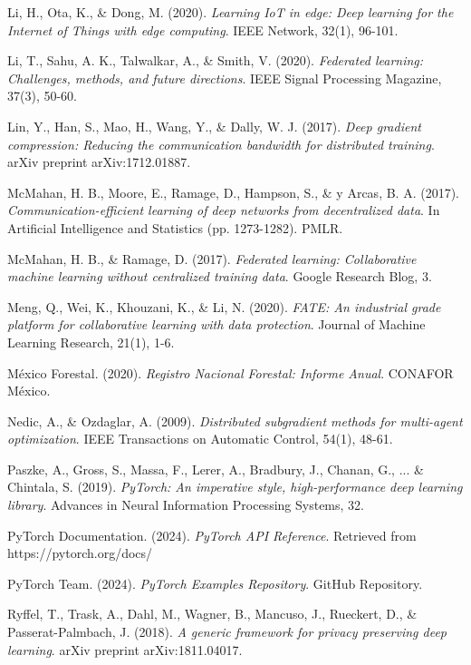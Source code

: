\begin{thebibliography}{99}
	Li, H., Ota, K., \& Dong, M. (2020).
	\textit{Learning IoT in edge: Deep learning for the Internet of Things with edge computing}.
	IEEE Network, 32(1), 96-101.
	
	Li, T., Sahu, A. K., Talwalkar, A., \& Smith, V. (2020).
	\textit{Federated learning: Challenges, methods, and future directions}.
	IEEE Signal Processing Magazine, 37(3), 50-60.
	
	Lin, Y., Han, S., Mao, H., Wang, Y., \& Dally, W. J. (2017).
	\textit{Deep gradient compression: Reducing the communication bandwidth for distributed training}.
	arXiv preprint arXiv:1712.01887.
	
	McMahan, H. B., Moore, E., Ramage, D., Hampson, S., \& y Arcas, B. A. (2017).
	\textit{Communication-efficient learning of deep networks from decentralized data}.
	In Artificial Intelligence and Statistics (pp. 1273-1282). PMLR.
	
	McMahan, H. B., \& Ramage, D. (2017).
	\textit{Federated learning: Collaborative machine learning without centralized training data}.
	Google Research Blog, 3.
	
	Meng, Q., Wei, K., Khouzani, K., \& Li, N. (2020).
	\textit{FATE: An industrial grade platform for collaborative learning with data protection}.
	Journal of Machine Learning Research, 21(1), 1-6.
	
	México Forestal. (2020).
	\textit{Registro Nacional Forestal: Informe Anual}.
	CONAFOR México.
	
	Nedic, A., \& Ozdaglar, A. (2009).
	\textit{Distributed subgradient methods for multi-agent optimization}.
	IEEE Transactions on Automatic Control, 54(1), 48-61.
	
	Paszke, A., Gross, S., Massa, F., Lerer, A., Bradbury, J., Chanan, G., ... \& Chintala, S. (2019).
	\textit{PyTorch: An imperative style, high-performance deep learning library}.
	Advances in Neural Information Processing Systems, 32.
	
	PyTorch Documentation. (2024).
	\textit{PyTorch API Reference}.
	Retrieved from https://pytorch.org/docs/
	
	PyTorch Team. (2024).
	\textit{PyTorch Examples Repository}.
	GitHub Repository.
	
	Ryffel, T., Trask, A., Dahl, M., Wagner, B., Mancuso, J., Rueckert, D., \& Passerat-Palmbach, J. (2018).
	\textit{A generic framework for privacy preserving deep learning}.
	arXiv preprint arXiv:1811.04017.
	

\end{thebibliography}
